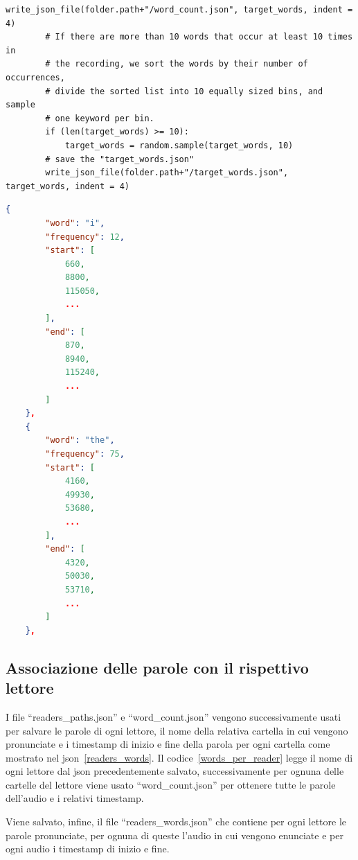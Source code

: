 \documentclass[12pt,a4paper,titlepage]{article}
\begin{document}
\begin{lstlisting}[language=iPython,firstnumber=1, caption=find\_target\_words.py, label=find_target_words,captionpos=b]
        write_json_file(folder.path+"/word_count.json", target_words, indent = 4)
        # If there are more than 10 words that occur at least 10 times in
        # the recording, we sort the words by their number of occurrences,
        # divide the sorted list into 10 equally sized bins, and sample 
        # one keyword per bin.
        if (len(target_words) >= 10):
            target_words = random.sample(target_words, 10)
        # save the "target_words.json"
        write_json_file(folder.path+"/target_words.json", target_words, indent = 4)

\end{lstlisting}

\begin{lstlisting}[language=json,firstnumber=1, caption=Formato del file word\_count.json, label=word_count,captionpos=b]
{
        "word": "i",
        "frequency": 12,
        "start": [
            660,
            8800,
            115050,
            ...
        ],
        "end": [
            870,
            8940,
            115240,
            ...
        ]
    },
    {
        "word": "the",
        "frequency": 75,
        "start": [
            4160,
            49930,
            53680,
            ...
        ],
        "end": [
            4320,
            50030,
            53710,
			...
   		]                
    },
\end{lstlisting}


\subsection{Associazione delle parole con il rispettivo lettore}
\label{subsec:unione}
I file ``readers\_paths.json'' e ``word\_count.json'' vengono successivamente usati per salvare le parole di ogni lettore, il nome della relativa cartella in cui vengono pronunciate e i timestamp di inizio e fine della parola per ogni cartella come mostrato nel json~\ref{readers_words}. Il codice~\ref{words_per_reader} legge il nome di ogni lettore dal json precedentemente salvato, successivamente per ognuna delle cartelle del lettore viene usato ``word\_count.json'' per ottenere tutte le parole dell'audio e i relativi timestamp.

Viene salvato, infine, il file ``readers\_words.json'' che contiene per ogni lettore le parole pronunciate, per ognuna di queste l'audio in cui vengono enunciate e per ogni audio i timestamp di inizio e fine.
\end{document}
